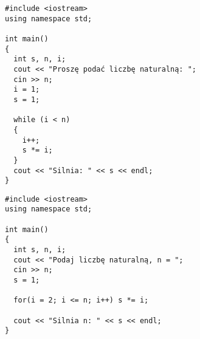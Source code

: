 \documentclass[a4paper,12pt]{article}
\begin{document}
\lstset{language=C++}
\begin{lstlisting}[caption=Liczba naturalna]
#include <iostream>
using namespace std;

int main()
{
  int s, n, i;
  cout << "Proszę podać liczbę naturalną: ";
  cin >> n;
  i = 1;
  s = 1;
  
  while (i < n)
  {
    i++;
    s *= i;
  }
  cout << "Silnia: " << s << endl;
}
\end{lstlisting}

\begin{lstlisting}[caption=Liczba naturalna 2]
#include <iostream>
using namespace std;

int main()
{
  int s, n, i;  
  cout << "Podaj liczbę naturalną, n = ";
  cin >> n;
  s = 1;  
  
  for(i = 2; i <= n; i++) s *= i;  
  
  cout << "Silnia n: " << s << endl;
}
\end{lstlisting}
\end{document}
